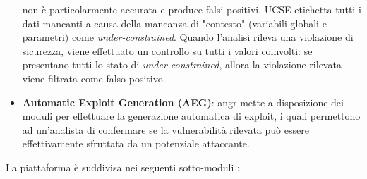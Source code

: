 \documentclass[../main.tex]{subfiles}
\begin{document}
\begin{itemize}
    non è particolarmente accurata e produce falsi positivi. UCSE etichetta tutti i dati mancanti a causa della mancanza di "contesto" (variabili globali e parametri) come \textit{under-constrained}. Quando l'analisi rileva una violazione di sicurezza, viene effettuato un controllo su tutti i valori coinvolti: se presentano tutti lo stato di \textit{under-constrained},
    allora la violazione rilevata viene filtrata come falso positivo.
    \item \textbf{Automatic Exploit Generation (AEG)}: angr mette a disposizione dei moduli per effettuare la generazione automatica di exploit, i quali permettono ad un'analista di confermare se la vulnerabilità rilevata può essere effettivamente sfruttata da un potenziale attaccante.
\end{itemize}
\newpage \noindent
La piattaforma è suddivisa nei seguenti sotto-moduli \cite{angr_introductory_paper}:
\end{document}
